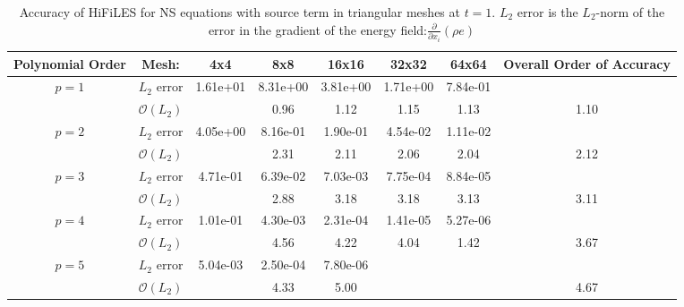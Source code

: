 \begin{table}[htbp]
\centering
\begin{tabular}{ c c c c c c c c} 
  
 Polynomial Order & Mesh: & 4x4 & 8x8 & 16x16 & 32x32 & 64x64 & Overall Order of Accuracy \\ 
 \hline 
 \multirow{2}{*}{$p = 1$} & $L_2$ error & 1.61e+01 & 8.31e+00 & 3.81e+00 & 1.71e+00 & 7.84e-01 &   \\ 
  
   & $\mathcal{O}(L_2)$ &   & 0.96 & 1.12 & 1.15 & 1.13 & 1.10 \\ 
 \hline 
 \multirow{2}{*}{$p = 2$} & $L_2$ error & 4.05e+00 & 8.16e-01 & 1.90e-01 & 4.54e-02 & 1.11e-02 &   \\ 
  
   & $\mathcal{O}(L_2)$ &   & 2.31 & 2.11 & 2.06 & 2.04 & 2.12 \\ 
 \hline 
 \multirow{2}{*}{$p = 3$} & $L_2$ error & 4.71e-01 & 6.39e-02 & 7.03e-03 & 7.75e-04 & 8.84e-05 &   \\ 
  
   & $\mathcal{O}(L_2)$ &   & 2.88 & 3.18 & 3.18 & 3.13 & 3.11 \\ 
 \hline 
 \multirow{2}{*}{$p = 4$} & $L_2$ error & 1.01e-01 & 4.30e-03 & 2.31e-04 & 1.41e-05 & 5.27e-06 &   \\ 
  
   & $\mathcal{O}(L_2)$ &   & 4.56 & 4.22 & 4.04 & 1.42 & 3.67 \\ 
 \hline 
 \multirow{2}{*}{$p = 5$} & $L_2$ error & 5.04e-03 & 2.50e-04 & 7.80e-06 &   &   &   \\ 
  
   & $\mathcal{O}(L_2)$ &   & 4.33 & 5.00 &   &   & 4.67 \\ 
 \hline 
 \end{tabular}
\caption{Accuracy of HiFiLES for NS equations with source term in triangular meshes at $t = 1$. $L_2$ error is the $L_2$-norm of the error in the gradient of the energy field:$\frac{\partial}{\partial x_i} (\rho e)$}
\label{table:trisError2} 
 \end{table}
